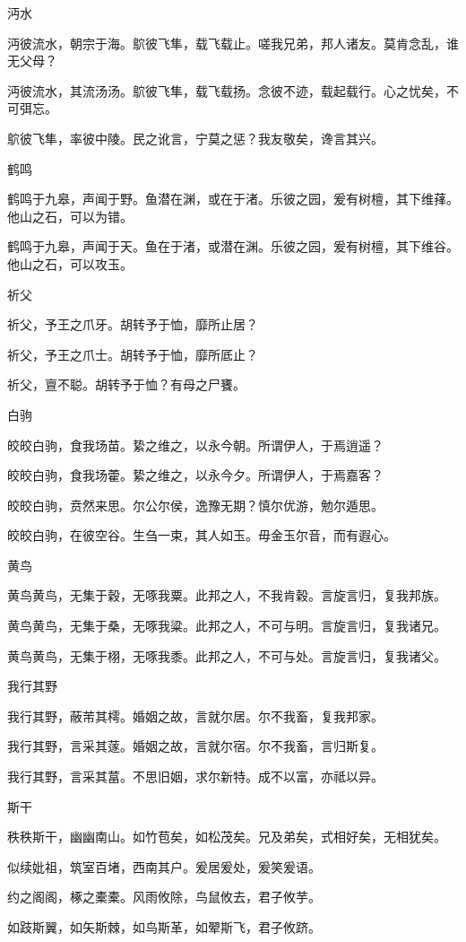沔水

沔彼流水，朝宗于海。鴥彼飞隼，载飞载止。嗟我兄弟，邦人诸友。莫肯念乱，谁无父母？

沔彼流水，其流汤汤。鴥彼飞隼，载飞载扬。念彼不迹，载起载行。心之忧矣，不可弭忘。

鴥彼飞隼，率彼中陵。民之讹言，宁莫之惩？我友敬矣，谗言其兴。

鹤鸣

鹤鸣于九皋，声闻于野。鱼潜在渊，或在于渚。乐彼之园，爰有树檀，其下维萚。他山之石，可以为错。

鹤鸣于九皋，声闻于天。鱼在于渚，或潜在渊。乐彼之园，爰有树檀，其下维谷。他山之石，可以攻玉。

祈父

祈父，予王之爪牙。胡转予于恤，靡所止居？

祈父，予王之爪士。胡转予于恤，靡所厎止？

祈父，亶不聪。胡转予于恤？有母之尸饔。

白驹

皎皎白驹，食我场苗。絷之维之，以永今朝。所谓伊人，于焉逍遥？

皎皎白驹，食我场藿。絷之维之，以永今夕。所谓伊人，于焉嘉客？

皎皎白驹，贲然来思。尔公尔侯，逸豫无期？慎尔优游，勉尔遁思。

皎皎白驹，在彼空谷。生刍一束，其人如玉。毋金玉尔音，而有遐心。

黄鸟

黄鸟黄鸟，无集于穀，无啄我粟。此邦之人，不我肯穀。言旋言归，复我邦族。

黄鸟黄鸟，无集于桑，无啄我粱。此邦之人，不可与明。言旋言归，复我诸兄。

黄鸟黄鸟，无集于栩，无啄我黍。此邦之人，不可与处。言旋言归，复我诸父。

我行其野

我行其野，蔽芾其樗。婚姻之故，言就尔居。尔不我畜，复我邦家。

我行其野，言采其蓫。婚姻之故，言就尔宿。尔不我畜，言归斯复。

我行其野，言采其葍。不思旧姻，求尔新特。成不以富，亦祗以异。

斯干

秩秩斯干，幽幽南山。如竹苞矣，如松茂矣。兄及弟矣，式相好矣，无相犹矣。

似续妣祖，筑室百堵，西南其户。爰居爰处，爰笑爰语。

约之阁阁，椓之橐橐。风雨攸除，鸟鼠攸去，君子攸芋。

如跂斯翼，如矢斯棘，如鸟斯革，如翚斯飞，君子攸跻。

